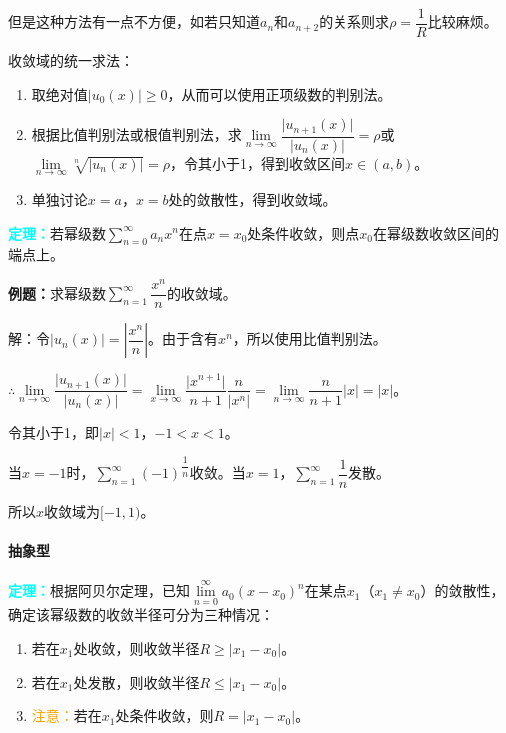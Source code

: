 \documentclass[UTF8, 12pt]{ctexart}
\begin{document}
但是这种方法有一点不方便，如若只知道$a_n$和$a_{n+2}$的关系则求$\rho=\dfrac{1}{R}$比较麻烦。

收敛域的统一求法：

\begin{enumerate}
    \item 取绝对值$\vert u_0(x)\vert\geqslant0$，从而可以使用正项级数的判别法。
    \item 根据比值判别法或根值判别法，求$\lim\limits_{n\to\infty}\dfrac{\vert u_{n+1}(x)\vert}{\vert u_n(x)\vert}=\rho$或$\lim\limits_{n\to\infty}\sqrt[n]{\vert u_n(x)\vert}=\rho$，令其小于1，得到收敛区间$x\in(a,b)$。
    \item 单独讨论$x=a$，$x=b$处的敛散性，得到收敛域。
\end{enumerate}

\textcolor{aqua}{\textbf{定理：}}若幂级数$\sum\limits_{n=0}^\infty a_nx^n$在点$x=x_0$处条件收敛，则点$x_0$在幂级数收敛区间的端点上。

\textbf{例题：}求幂级数$\sum\limits_{n=1}^\infty\dfrac{x^n}{n}$的收敛域。

解：令$\vert u_n(x)\vert=\left\vert\dfrac{x^n}{n}\right\vert$。由于含有$x^n$，所以使用比值判别法。

$\therefore\lim\limits_{n\to\infty}\dfrac{\vert u_{n+1}(x)\vert}{\vert u_n(x)\vert}=\lim\limits_{x\to\infty}\dfrac{\vert x^{n+1}\vert}{n+1}\dfrac{n}{\vert x^n\vert}=\lim\limits_{n\to\infty}\dfrac{n}{n+1}\vert x\vert=\vert x\vert$。\medskip

令其小于1，即$\vert x\vert<1$，$-1<x<1$。

当$x=-1$时，$\sum\limits_{n=1}^\infty(-1)^\dfrac{1}{n}$收敛。当$x=1$，$\sum\limits_{n=1}^\infty\dfrac{1}{n}$发散。

所以$x$收敛域为$[-1,1)$。

\paragraph{抽象型} \leavevmode \medskip

\textcolor{aqua}{\textbf{定理：}}根据阿贝尔定理，已知$\lim\limits_{n=0}^\infty a_0(x-x_0)^n$在某点$x_1$（$x_1\neq x_0$）的敛散性，确定该幂级数的收敛半径可分为三种情况：

\begin{enumerate}
    \item 若在$x_1$处收敛，则收敛半径$R\geqslant\vert x_1-x_0\vert$。
    \item 若在$x_1$处发散，则收敛半径$R\leqslant\vert x_1-x_0\vert$。
    \item \textcolor{orange}{注意：}若在$x_1$处条件收敛，则$R=\vert x_1-x_0\vert$。
\end{enumerate}
\end{document}
